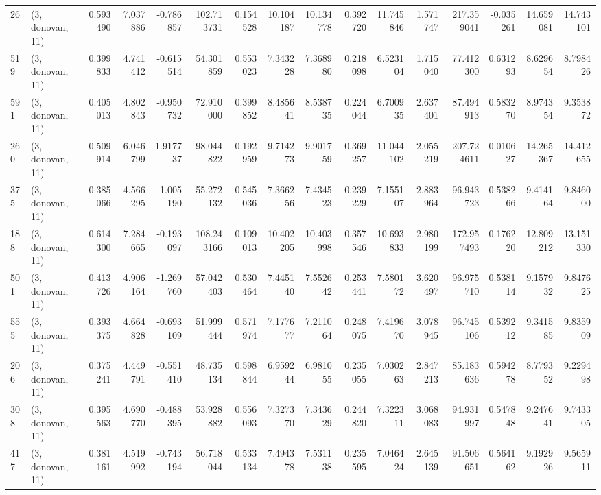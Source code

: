 \begin{tabular}{llrrrrrrrrrrrrrr}
26  &  (3, donovan, 11) &   0.593490 &   7.037886 &  -0.786857 &   102.713731 &   0.154528 &  10.104187 &  10.134778 &  0.392720 &  11.745846 &   1.571747 &    217.359041 &  -0.035261 &   14.659081 &   14.743101 \\
519 &  (3, donovan, 11) &   0.399833 &   4.741412 &  -0.615514 &    54.301859 &   0.553023 &   7.343228 &   7.368980 &  0.218098 &   6.523104 &   1.715040 &     77.412300 &   0.631293 &    8.629654 &    8.798426 \\
591 &  (3, donovan, 11) &   0.405013 &   4.802843 &  -0.950732 &    72.910000 &   0.399852 &   8.485641 &   8.538735 &  0.224044 &   6.700935 &   2.637401 &     87.494913 &   0.583270 &    8.974354 &    9.353872 \\
260 &  (3, donovan, 11) &   0.509914 &   6.046799 &   1.917737 &    98.044822 &   0.192959 &   9.714273 &   9.901759 &  0.369257 &  11.044102 &   2.055219 &    207.724611 &   0.010627 &   14.265367 &   14.412655 \\
375 &  (3, donovan, 11) &   0.385066 &   4.566295 &  -1.005190 &    55.272132 &   0.545036 &   7.366256 &   7.434523 &  0.239229 &   7.155107 &   2.883964 &     96.943723 &   0.538266 &    9.414164 &    9.846000 \\
188 &  (3, donovan, 11) &   0.614300 &   7.284665 &  -0.193097 &   108.243166 &   0.109013 &  10.402205 &  10.403998 &  0.357546 &  10.693833 &   2.980199 &    172.957493 &   0.176220 &   12.809212 &   13.151330 \\
501 &  (3, donovan, 11) &   0.413726 &   4.906164 &  -1.269760 &    57.042403 &   0.530464 &   7.445140 &   7.552642 &  0.253441 &   7.580172 &   3.620497 &     96.975710 &   0.538114 &    9.157932 &    9.847625 \\
555 &  (3, donovan, 11) &   0.393375 &   4.664828 &  -0.693109 &    51.999444 &   0.571974 &   7.177677 &   7.211064 &  0.248075 &   7.419670 &   3.078945 &     96.745106 &   0.539212 &    9.341585 &    9.835909 \\
206 &  (3, donovan, 11) &   0.375241 &   4.449791 &  -0.551410 &    48.735134 &   0.598844 &   6.959244 &   6.981055 &  0.235055 &   7.030263 &   2.847213 &     85.183636 &   0.594278 &    8.779352 &    9.229498 \\
308 &  (3, donovan, 11) &   0.395563 &   4.690770 &  -0.488395 &    53.928882 &   0.556093 &   7.327370 &   7.343629 &  0.244820 &   7.322311 &   3.068083 &     94.931997 &   0.547848 &    9.247641 &    9.743305 \\
417 &  (3, donovan, 11) &   0.381161 &   4.519992 &  -0.743194 &    56.718044 &   0.533134 &   7.494378 &   7.531138 &  0.235595 &   7.046424 &   2.645139 &     91.506651 &   0.564162 &    9.192926 &    9.565911 \\

\end{tabular}

